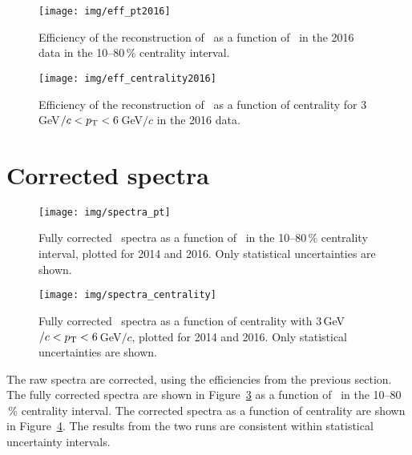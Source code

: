 \begin{figure}[!p]
\centering
\texttt{[image: img/eff\_pt2016]}
\caption{\label{eff_pt2016} Efficiency of the reconstruction of \Lambdac\ as a function of \pt\ in the 2016 data in the 10--80$\,\%$ centrality interval.}
\end{figure}

\begin{figure}[!p]
\centering
\texttt{[image: img/eff\_centrality2016]}
\caption{\label{eff_centrality2016} Efficiency of the reconstruction of \Lambdac\ as a function of centrality for $3\,$GeV$/c < {p_{\mathrm{T}}} < 6\,$GeV$/c$ in the 2016 data.}
\end{figure}

\section{Corrected spectra}

\begin{figure}[!htb]
\centering
\texttt{[image: img/spectra\_pt]}
\caption{\label{spectraPt} Fully corrected \Lambdac\ spectra as a function of \pt\ in the 10--80$\,\%$ centrality interval, plotted for 2014 and 2016. Only statistical uncertainties are shown.}
\end{figure}

\begin{figure}[!htb]
\centering
\texttt{[image: img/spectra\_centrality]}
\caption{\label{spectraCent} Fully corrected \Lambdac\ spectra as a function of centrality with $3\,$GeV$/c < {p_{\mathrm{T}}} < 6\,$GeV$/c$, plotted for 2014 and 2016. Only statistical uncertainties are shown.}
\end{figure}

The raw spectra are corrected, using the efficiencies from the previous section. The fully corrected spectra are shown in Figure~\ref{spectraPt} as a function of \pt\ in the 10--80$\,\%$ centrality interval. The corrected spectra as a function of centrality are shown in Figure~\ref{spectraCent}\@. The results from the two runs are consistent within statistical uncertainty intervals.



